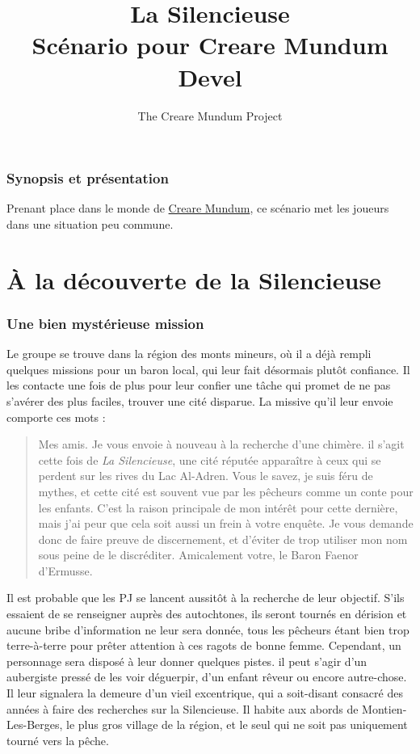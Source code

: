 \documentclass[a4paper, 11pt]{article}
\title{La Silencieuse \\ Scénario pour Creare Mundum \\ Devel}
\author{The Creare Mundum Project}
\date{\oldstylenums{\insertdate}}
\begin{document}
\maketitle
\setcounter{tocdepth}{1} %
\renewcommand{\contentsname}{Sommaire} 
\tableofcontents
\newpage
\section{Synopsis et présentation}
Prenant place dans le monde de {\hyperlink {participation} {Creare Mundum}}, ce scénario met les joueurs dans une situation peu commune. 
\part{À la découverte de la Silencieuse}
\section{Une bien mystérieuse mission}
Le groupe se trouve dans la région des monts mineurs, où il a déjà rempli quelques missions pour un baron local, qui leur fait désormais plutôt confiance. Il les contacte une fois de plus pour leur confier une tâche qui promet de ne pas s'avérer des plus faciles, trouver une cité disparue. La missive qu'il leur envoie comporte ces mots :
\begin{quotation}
Mes amis. 
\newline
Je vous envoie à nouveau à la recherche d'une chimère. il s'agit cette fois de \textit{La Silencieuse}, une cité réputée apparaître à ceux qui se perdent sur les rives du Lac Al-Adren. Vous le savez, je suis féru de mythes, et cette cité est souvent vue par les pêcheurs comme un conte pour les enfants. C'est la raison principale de mon intérêt pour cette dernière, mais j'ai peur que cela soit aussi un frein à votre enquête. Je vous demande donc de faire preuve de discernement, et d'éviter de trop utiliser mon nom sous peine de le discréditer.
\newline
Amicalement votre, le Baron Faenor d'Ermusse.
\end{quotation}
Il est probable que les PJ se lancent aussitôt à la recherche de leur objectif. S'ils essaient de se renseigner auprès des autochtones, ils seront tournés en dérision et aucune bribe d'information ne leur sera donnée, tous les pêcheurs étant bien trop terre-à-terre pour prêter attention à ces ragots de bonne femme. Cependant, un personnage sera disposé à leur donner quelques pistes. il peut s'agir d'un aubergiste pressé de les voir déguerpir, d'un enfant rêveur ou encore autre-chose. Il leur signalera la demeure d'un vieil excentrique, qui a soit-disant consacré des années à faire des recherches sur la Silencieuse. Il habite aux abords de Montien-Les-Berges, le plus gros village de la région, et le seul qui ne soit pas uniquement tourné vers la pêche. 
\end{document}
